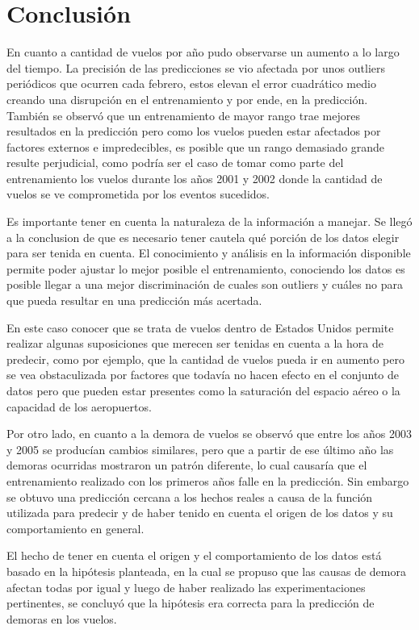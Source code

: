\section{Conclusión}

En cuanto a cantidad de vuelos por año pudo observarse un aumento a lo largo del tiempo. La precisión de las predicciones se vio afectada por unos outliers periódicos que ocurren cada febrero, estos elevan el error cuadrático medio creando una disrupción en el entrenamiento y por ende, en la predicción. También se observó que un entrenamiento de mayor rango trae mejores resultados en la predicción pero como los vuelos pueden estar afectados por factores externos e impredecibles, es posible que un rango demasiado grande resulte perjudicial, como podría ser el caso de tomar como parte del entrenamiento los vuelos durante los años 2001 y 2002 donde la cantidad de vuelos se ve comprometida por los eventos sucedidos.

Es importante tener en cuenta la naturaleza de la información a manejar. Se llegó a la conclusion de que es necesario tener cautela qué porción de los datos elegir para ser tenida en cuenta. El conocimiento y análisis en la información disponible permite poder ajustar lo mejor posible el entrenamiento, conociendo los datos es posible llegar a una mejor discriminación de cuales son outliers y cuáles no para que pueda resultar en una predicción más acertada.

En este caso conocer que se trata de vuelos dentro de Estados Unidos permite realizar algunas suposiciones que merecen ser tenidas en cuenta a la hora de predecir, como por ejemplo, que la cantidad de vuelos pueda ir en aumento pero se vea obstaculizada por factores que todavía no hacen efecto en el conjunto de datos pero que pueden estar presentes como la saturación del espacio aéreo o la capacidad de los aeropuertos.

Por otro lado, en cuanto a la demora de vuelos se observó que entre los años 2003 y 2005 se producían cambios similares, pero que a partir de ese último año las demoras ocurridas mostraron un patrón diferente, lo cual causaría que el entrenamiento realizado con los primeros años falle en la predicción. Sin embargo se obtuvo una predicción cercana a los hechos reales a causa de la función utilizada para predecir y de haber tenido en cuenta el origen de los datos y su comportamiento en general.

El hecho de tener en cuenta el origen y el comportamiento de los datos está basado en la hipótesis planteada, en la cual se propuso que las causas de demora afectan todas por igual y luego de haber realizado las experimentaciones pertinentes, se concluyó que la hipótesis era correcta para la predicción de demoras en los vuelos.